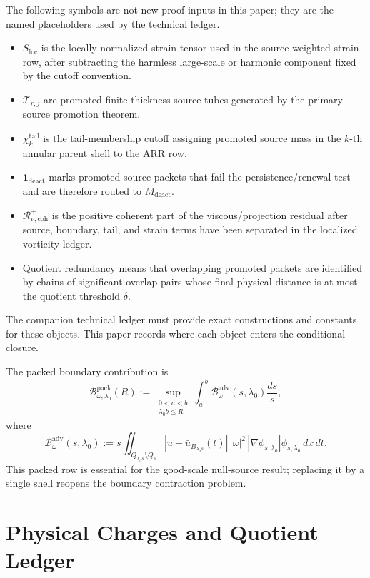 \documentclass[11pt]{article}
\begin{document}
The following symbols are not new proof inputs in this paper; they are the
named placeholders used by the technical ledger.
\begin{itemize}
\item \(S_{\mathrm{loc}}\) is the locally normalized strain tensor used in the
source-weighted strain row, after subtracting the harmless large-scale or
harmonic component fixed by the cutoff convention.
\item \(\mathcal T_{r,j}\) are promoted finite-thickness source tubes generated
by the primary-source promotion theorem.
\item \(\chi_k^{\mathrm{tail}}\) is the tail-membership cutoff assigning
promoted source mass in the \(k\)-th annular parent shell to the ARR row.
\item \(\mathbf 1_{\mathrm{deact}}\) marks promoted source packets that fail the
persistence/renewal test and are therefore routed to \(M_{\mathrm{deact}}\).
\item \(\mathcal R_{\nu,\mathrm{coh}}^+\) is the positive coherent part of the
viscous/projection residual after source, boundary, tail, and strain terms have
been separated in the localized vorticity ledger.
\item Quotient redundancy means that overlapping promoted packets are
identified by chains of significant-overlap pairs whose final physical distance
is at most the quotient threshold \(\delta\).
\end{itemize}
The companion technical ledger must provide exact constructions and constants
for these objects.  This paper records where each object enters the conditional
closure.

The packed boundary contribution is
\begin{equation}
\label{eq:packed-boundary}
\mathcal B_{\omega,\lambda_0}^{\mathrm{pack}}(R)
:=
\sup_{\substack{0<a<b\\ \lambda_0 b\le R}}
\int_a^b
\mathcal B_{\omega}^{\mathrm{adv}}(s,\lambda_0)
\frac{ds}{s},
\end{equation}
where
\[
\mathcal B_{\omega}^{\mathrm{adv}}(s,\lambda_0)
:=
s\iint_{Q_{\lambda_0s}\setminus Q_s}
|u-\bar u_{B_{\lambda_0s}}(t)|\,|\omega|^2\,
|\nabla\phi_{s,\lambda_0}|\phi_{s,\lambda_0}\,dx\,dt.
\]
This packed row is essential for the good-scale null-source result; replacing
it by a single shell reopens the boundary contraction problem.

\clearpage
\section{Physical Charges and Quotient Ledger}
\label{sec:physical-ledger}
\end{document}
